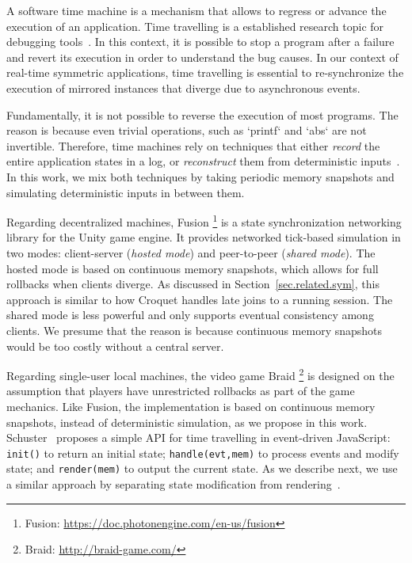 \documentclass[fleqn,10pt]{SelfArx}
\newcommand{\code}[1]  {\texttt{\footnotesize{#1}}}
\begin{document}
A software time machine is a mechanism that allows to regress or advance the
execution of an application.
%
Time travelling is a established research topic for debugging
tools~\cite{tml.review}.
In this context, it is possible to stop a program after a failure and revert
its execution in order to understand the bug causes.
%
In our context of real-time symmetric applications, time travelling is
essential to re-synchronize the execution of mirrored instances that diverge
due to asynchronous events.

Fundamentally, it is not possible to reverse the execution of most programs.
The reason is because even trivial operations, such as `printf` and `abs` are
not invertible.
Therefore, time machines rely on techniques that either \emph{record} the
entire application states in a log, or \emph{reconstruct} them from
deterministic inputs~\cite{tml.review}.
%
In this work, we mix both techniques by taking periodic memory snapshots and
simulating deterministic inputs in between them.

Regarding decentralized machines, Fusion%
\footnote{Fusion: \url{https://doc.photonengine.com/en-us/fusion}}
is a state synchronization networking library for the Unity game engine.
It provides networked tick-based simulation in two modes: client-server
(\emph{hosted mode}) and peer-to-peer (\emph{shared mode}).
The hosted mode is based on continuous memory snapshots, which allows for
full rollbacks when clients diverge.
As discussed in Section~\ref{sec.related.sym}, this approach is similar to how
Croquet handles late joins to a running session.
The shared mode is less powerful and only supports eventual consistency among
clients.
We presume that the reason is because continuous memory snapshots would be too
costly without a central server.

Regarding single-user local machines, the video game Braid%
\footnote{Braid: \url{http://braid-game.com/}}
is designed on the assumption that players have unrestricted rollbacks as part
of the game mechanics.
Like Fusion, the implementation is based on continuous memory snapshots,
instead of deterministic simulation, as we propose in this work.
%
Schuster~\cite{tml.js} proposes a simple API for time travelling in
event-driven JavaScript:
    \code{init()} to return an initial state;
    \code{handle(evt,mem)} to process events and modify state; and
    \code{render(mem)} to output the current state.
As we describe next, we use a similar approach by separating state modification
from rendering~\cite{tml.alive}.
\end{document}
